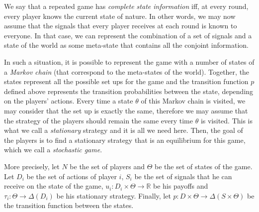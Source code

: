 We say that a repeated game has \emph{complete state information} iff, at every round, every player knows the current state of nature. In other words, we may now assume that the signals that every player receives at each round is known to everyone. In that case, we can represent the combination of a set of signals and a state of the world as some meta-state that contains all the conjoint information.

In such a situation, it is possible to represent the game with a number of states of a \emph{Markov chain} (that correspond to the meta-states of the world). Together, the states represent all the possible set ups for the game and the transition function $p$ defined above represents the transition probabilities between the state, depending on the players' actions. Every time a state $\theta$ of this Markov chain is visited, we may consider that the set up is exactly the same, therefore we may assume that the strategy of the players should remain the same every time $\theta$ is visited. This is what we call a \emph{stationary} strategy and it is all we need here. Then, the goal of the players is to find a stationary strategy that is an equilibrium for this game, which we call a \emph{stochastic game}.

More precisely, let $N$ be the set of players and $\Theta$ be the set of states of the game. Let $D_i$ be the set of actions of player $i$, $S_i$ be the set of signals that he can receive on the state of the game, $u_i : D_i \times \Theta \rightarrow \mathbb{R}$ be his payoffs and $\tau_i : \Theta \rightarrow \Delta(D_i)$ be his stationary strategy. Finally, let $p : D \times \Theta \rightarrow \Delta(S \times \Theta)$ be the transition function between the states.

